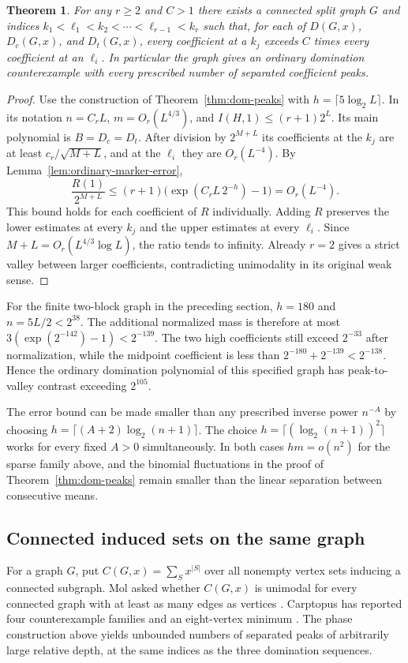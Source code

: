 \documentclass[11pt,a4paper]{article}
\newtheorem{theorem}{Theorem}[section]
\begin{document}
\begin{theorem}\label{thm:ordinary-domination-peaks}
For any $r\ge2$ and $C>1$ there exists a connected split graph $G$
and indices $k_1<\ell_1<k_2<\cdots<\ell_{r-1}<k_r$ such that,
for each of $D(G,x)$, $D_c(G,x)$, and $D_t(G,x)$, every coefficient at
a $k_j$ exceeds $C$ times every coefficient at an $\ell_i$.
In particular the graph gives an ordinary domination counterexample
with every prescribed number of separated coefficient peaks.
\end{theorem}
\begin{proof}
Use the construction of Theorem~\ref{thm:dom-peaks} with
$h=\lceil5\log_2 L\rceil$. In its notation $n=C_r L$,
$m=O_r(L^{4/3})$, and $I(H,1)\le(r+1)2^L$. Its main polynomial is
$B=D_c=D_t$. After division by $2^{M+L}$ its coefficients at the
$k_j$ are at least $c_r/\sqrt{M+L}$, and at the $\ell_i$ they are
$O_r(L^{-4})$. By Lemma~\ref{lem:ordinary-marker-error},
\[
 \frac{R(1)}{2^{M+L}}
 \le(r+1)\big(\exp(C_r L\,2^{-h})-1\big)=O_r(L^{-4}).
\]
This bound holds for each coefficient of $R$ individually. Adding $R$
preserves the lower estimates at every $k_j$ and the upper estimates
at every $\ell_i$. Since $M+L=O_r(L^{4/3}\log L)$, the ratio tends
to infinity. Already $r=2$ gives a strict valley between larger
coefficients, contradicting unimodality in its original weak sense.
\end{proof}

For the finite two-block graph in the preceding section, $h=180$ and
$n=5L/2<2^{38}$. The additional normalized mass is therefore at most
$3(\exp(2^{-142})-1)<2^{-139}$. The two high coefficients still
exceed $2^{-33}$ after normalization, while the midpoint coefficient
is less than $2^{-180}+2^{-139}<2^{-138}$. Hence the ordinary
domination polynomial of this specified graph has peak-to-valley
contrast exceeding $2^{105}$.

The error bound can be made smaller than any prescribed inverse power
$n^{-A}$ by choosing $h=\lceil(A+2)\log_2(n+1)\rceil$. The choice
$h=\lceil(\log_2(n+1))^2\rceil$ works for every fixed $A>0$
simultaneously. In both cases $hm=o(n^2)$ for the sparse family above,
and the binomial fluctuations in the proof of Theorem~\ref{thm:dom-peaks}
remain smaller than the linear separation between consecutive means.

\subsection{Connected induced sets on the same graph}
For a graph $G$, put $C(G,x)=\sum_S x^{|S|}$ over all nonempty
vertex sets inducing a connected subgraph. Mol asked whether
$C(G,x)$ is unimodal for every connected graph with at least as many
edges as vertices \cite[Chapter~6]{molthesis}. Carptopus has reported
four counterexample families and an eight-vertex minimum
\cite{carptopusconnected}. The phase construction above yields unbounded
numbers of separated peaks of arbitrarily large relative depth, at
the same indices as the three domination sequences.
\end{document}
